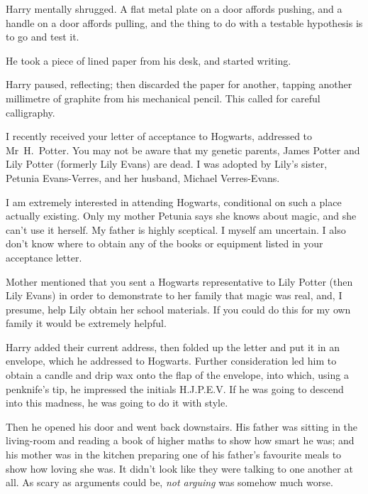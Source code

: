 Harry mentally shrugged. A flat metal plate on a door affords pushing, and a
handle on a door affords pulling, and the thing to do with a testable
hypothesis is to go and test it.

He took a piece of lined paper from his desk, and started writing.

\begin{writtenNote}
\end{writtenNote}

Harry paused, reflecting; then discarded the paper for another, tapping another
millimetre of graphite from his mechanical pencil. This called for careful
calligraphy.

\begin{writtenNote}


I recently received your letter of acceptance to Hogwarts, addressed to
Mr~H.~Potter. You may not be aware that my genetic parents, James Potter and
Lily Potter (formerly Lily Evans) are dead. I was adopted by Lily's sister,
Petunia Evans-Verres, and her husband, Michael Verres-Evans.

I am extremely interested in attending Hogwarts, conditional on such a
place actually existing. Only my mother Petunia says she knows about magic, and
she can't use it herself. My father is highly sceptical. I myself am uncertain.
I also don't know where to obtain any of the books or equipment listed in your
acceptance letter.

Mother mentioned that you sent a Hogwarts representative to Lily Potter
(then Lily Evans) in order to demonstrate to her family that magic was real,
and, I presume, help Lily obtain her school materials. If you could do this for
my own family it would be extremely helpful.

\end{writtenNote}

Harry added their current address, then folded up the letter and put it in an
envelope, which he addressed to Hogwarts. Further consideration led him to
obtain a candle and drip wax onto the flap of the envelope, into which, using a
penknife's tip, he impressed the initials H.J.P.E.V\@. If he was going to descend
into this madness, he was going to do it with style.

Then he opened his door and went back downstairs. His father was sitting in the
living-room and reading a book of higher maths to show how smart he was; and
his mother was in the kitchen preparing one of his father's favourite meals to
show how loving she was. It didn't look like they were talking to one another
at all. As scary as arguments could be, \emph{not arguing} was somehow much
worse.

